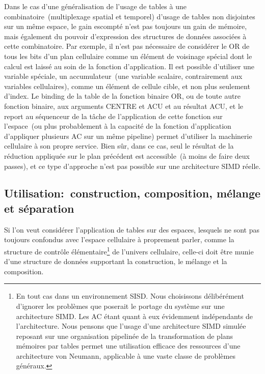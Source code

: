 Dans le cas d'une généralisation de l'usage de tables à une
combinatoire~(multiplexage spatial et temporel) d'usage de tables non
disjointes sur un même espace, le gain escompté n'est pas toujours un
gain de mémoire, mais également du pouvoir d'expression des structures
de données associées à cette combinatoire. %
Par exemple, il n'est pas nécessaire de considérer le OR de tous les
bits d'un plan cellulaire comme un élément de voisinage spécial dont
le calcul est laissé au soin de la fonction d'application. %
Il est possible d'utiliser une variable spéciale, un accumulateur~(une
variable scalaire, contrairement aux variables cellulaires), comme un
élément de cellule cible, et non plus seulement d'index. %
Le binding de la table de la fonction binaire OR, ou de toute autre
fonction binaire, aux arguments CENTRE et ACU et au résultat ACU, et
le report au séquenceur de la tâche de l'application de cette fonction
sur l'espace~(ou plus probablement à la capacité de la fonction
d'application d'appliquer plusieurs AC sur un même pipeline) permet
d'utiliser la machinerie cellulaire à son propre service. %
Bien sûr, dans ce cas, seul le résultat de la réduction appliquée sur
le plan précédent est accessible~(à moins de faire deux passes), et ce
type d'approche n'est pas possible sur une architecture SIMD réelle. %

\subsection{Utilisation:~construction, composition, mélange et
  sé\-paration}

Si l'on veut considérer l'application de tables sur des espaces,
lesquels ne sont pas toujours confondus avec l'espace cellulaire à
proprement parler, comme la structure de contrôle
élémentaire\footnote{%
  En tout cas dans un environnement SISD\@. %
  Nous choisissons délibérément d'ignorer les problèmes que poserait
  le portage du système sur une architecture SIMD\@. %
  Les AC étant quant à eux évidemment indépendants de
  l'architecture. %
  Nous pensons que l'usage d'une architecture SIMD simulée reposant
  sur une organisation pipelinée de la transformation de plans
  mémoires par tables permet une utilisation efficace des ressources
  d'une architecture von Neumann, applicable à une vaste classe de
  problèmes généraux.} %
de l'univers cellulaire, celle-ci doit être munie d'une structure de
données supportant la construction, le mélange et la composition. %

